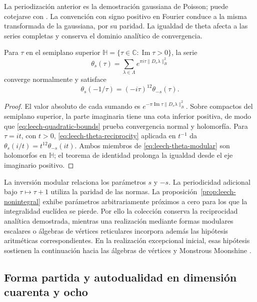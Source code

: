 La periodización anterior es la demostración gaussiana de Poisson;
puede cotejarse con \cite[teorema 2, pp.~10--11]{Elkies}.
La convención con signo positivo en Fourier conduce a la misma
transformada de la gaussiana, por su paridad. La igualdad de theta
afecta a las series completas y conserva el dominio analítico de
convergencia.

\begin{proposition}
\label{prop:leech-theta-complex}
Para \(\tau\) en el semiplano superior
\(\mathbb H=\{\tau\in\mathbb C:\operatorname{Im}\tau>0\}\), la serie
\begin{equation}
 \theta_s(\tau)=\sum_{\lambda\in\Lambda}
             e^{\pi i\tau\|D_s\lambda\|_B^2}
 \label{eq:leech-theta-complex}
\end{equation}
converge normalmente y satisface
\begin{equation}
 \theta_s(-1/\tau)=(-i\tau)^{12}\theta_{-s}(\tau).
 \label{eq:leech-theta-modular}
\end{equation}
\end{proposition}
\begin{proof}
El valor absoluto de cada sumando es
\(e^{-\pi\operatorname{Im}\tau\|D_s\lambda\|_B^2}\).
Sobre compactos del semiplano superior, la parte imaginaria tiene
una cota inferior positiva, de modo que
\eqref{eq:leech-quadratic-bounds} prueba convergencia normal y
holomorfía. Para \(\tau=it\), con \(t>0\),
\eqref{eq:leech-theta-reciprocity} aplicada en \(t^{-1}\) da
\(\theta_s(i/t)=t^{12}\theta_{-s}(it)\).
Ambos miembros de \eqref{eq:leech-theta-modular} son holomorfos
en \(\mathbb H\); el teorema de identidad prolonga la igualdad
desde el eje imaginario positivo.
\end{proof}

La inversión modular relaciona los parámetros \(s\) y \(-s\).
La periodicidad adicional bajo \(\tau\mapsto\tau+1\) utiliza la
paridad de las normas. La proposición~\ref{prop:leech-nonintegral}
exhibe parámetros arbitrariamente próximos a cero para los que
la integralidad euclídea se pierde. Por ello la colección conserva
la reciprocidad analítica demostrada, mientras una realización
mediante formas modulares escalares o álgebras de vértices
reticulares incorpora además las hipótesis aritméticas
correspondientes. En la realización excepcional inicial, esas
hipótesis sostienen la continuación hacia las álgebras de vértices
y Monstrous Moonshine \cite{HMT-IV}.

\subsection{Forma partida y autodualidad en dimensión cuarenta y ocho}
\label{subsec:leech-split}

